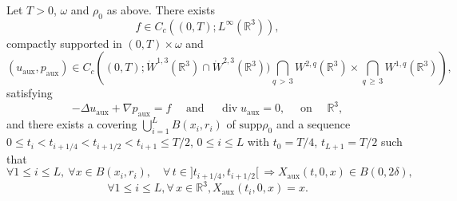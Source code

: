 \documentclass[AHL,Unicode,longabstracts,published]{cedram}
\newcommand{\supp}{\mathrm{supp} }
\newcommand{\aux}{\mathrm{aux}}
\newcommand{\R}{\mathbb{R}}
\renewcommand{\leq}{\leqslant}
\renewcommand{\geq}{\geqslant}
\renewcommand{\div}{\operatorname{div}}
\let\oldforall\forall
\renewcommand*{\forall}{\mathrel{\oldforall}}
\begin{document}
\begin{prop}\label{lemme1}
Let $T>0$, $\omega$ and $\rho_0$ as above. There exists
\[
f\in C_c\left((0,T);L^\infty\left(\R^3\right)\right),
\]
compactly supported in $(0,T)\times \omega$ and
\[
(u_\aux,p_{\aux}) \in C_c\left((0,T);\dot{W}^{1,3}\left(\R^3\right)\cap \dot{W}^{2,3}\left(\R^3\right))\bigcap_{q\,>\,3} W^{2,q}\left(\R^3\right) \times \bigcap_{q\,\geq\,3}W^{1,q}\left(\R^3\right)\right),
\]
satisfying
\[
-\Delta u_\aux +\nabla p_\aux = f \quad \text{ and } \quad \div u_\aux=0,
\quad \text{ on } \quad \R^3,
\]
and there exists a covering ${{\bigcup}_{i=1}^{L}} B(x_i,r_i)$ of $\supp \rho_0$ and a sequence $0\leq t_i<t_{i+1/4}<t_{i+1/2}<t_{i+1}\leq T/2$, $0\leq i \leq L $ with $t_0=T/4$, $t_{L+1}=T/2$ such that
\begin{equation}\label{forumule_controle_zone}
\forall 1 \leq i \leq L,\: \forall x\in B(x_i, r_i), \quad \forall \, t \in]t_{i+1/4},t_{i+1/2}[\,\Rightarrow X_\aux(t,0,x)\in B(0,2\delta),
\end{equation}
\[
\forall 1 \leq i \leq L, \forall\, x \in \R^3, X_{\aux}(t_i,0,x)=x.
\]
\end{prop}
\end{document}
